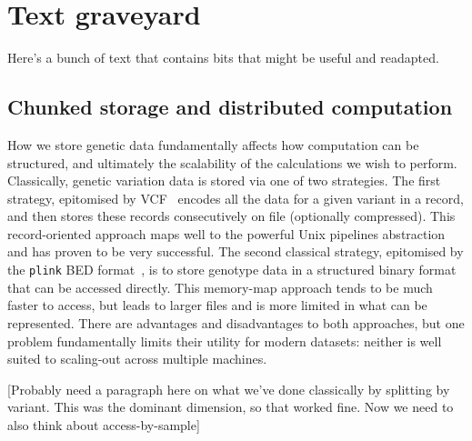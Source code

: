 \documentclass[a4paper,num-refs]{oup-contemporary}
\begin{document}
\clearpage
\section*{Text graveyard}

Here's a bunch of text that contains bits that might be useful and readapted.


\subsection{Chunked storage and distributed computation}
How we store genetic data fundamentally affects how computation
can be structured, and ultimately the scalability of the calculations
we wish to perform. Classically, genetic variation data is stored via one
of two strategies. The first strategy, epitomised by
VCF~\citep{danecek2011variant} encodes all the data for a given
variant in a record, and then stores these records consecutively on file
(optionally compressed). This record-oriented approach maps well to the
powerful Unix pipelines abstraction and
has proven to be very successful.
The second classical strategy, epitomised
by the \texttt{plink} BED format~\citep{purcell2007plink}, is to
store genotype data in a structured binary format that can be
accessed directly. This memory-map approach tends to
be much faster to access, but leads to larger files and is more
limited in what can be represented. There are advantages and
disadvantages to both approaches, but one problem fundamentally
limits their utility for modern datasets: neither is well suited to
scaling-out across multiple machines.

[Probably need a paragraph here on what we've done classically
by splitting by variant. This was the dominant dimension, so that
worked fine. Now we need to also think about access-by-sample]
\end{document}
